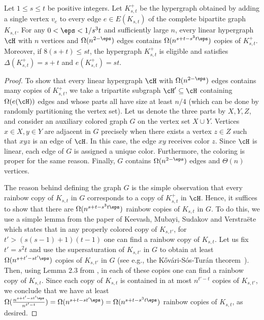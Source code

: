 \begin{lemma}\label{lemma:start}
Let $1\leq s\leq t$ be positive integers. Let $K_{s, t}^+$ be the hypergraph obtained by adding a single vertex $v_e$ to every edge $e\in E(K_{s, t})$ of the complete bipartite graph $K_{s, t}$. For any $0<\eps<1/s^3t$ and sufficiently large $n$, every linear hypergraph $\cH$ with $n$ vertices and $\Omega(n^{2-\eps})$ edges contains $\Omega(n^{s+t-s^3t\eps})$ copies of $K_{s, t}^+$. Moreover, if $8(s+t)\leq st$, the hypergraph $K_{s, t}^+$ is eligible and satisfies $\Delta(K_{s, t}^+)=s+t$ and $e(K_{s, t}^+)=st$.
\end{lemma}
\begin{proof}
To show that every linear hypergraph $\cH$ with $\Omega(n^{2-\eps})$ edges contains many copies of $K_{s, t}^+$, we take a tripartite subgraph $\cH'\subseteq \cH$ containing $\Omega(e(\cH))$ edges and whose parts all have size at least $n/4$ (which can be done by randomly partitioning the vertex set). Let us denote the three parts by $X, Y, Z$, and consider an auxiliary colored graph $G$ on the vertex set $X\cup Y$. Vertices $x\in X, y\in Y$ are adjacent in $G$ precisely when there exists a vertex $z\in Z$ such that $xyz$ is an edge of $\cH$. In this case, the edge $xy$ receives color $z$. Since $\cH$ is linear, each edge of $G$ is assigned a unique color. Furthermore, the coloring is proper for the same reason. Finally, $G$ contains $\Omega(n^{2-\eps})$ edges and $\Theta(n)$ vertices.

The reason behind defining the graph $G$ is the simple observation that every rainbow copy of $K_{s, t}$ in $G$ corresponds to a copy of $K_{s, t}^+$ in $\cH$. Hence, it suffices to show that there are $\Omega(n^{s+t-s^3t\eps})$ rainbow copies of $K_{s, t}$ in $G$. To do this, we use a simple lemma from the paper of Keevash, Mubayi, Sudakov and Verstra\"ete \cite{KMSV07} which states that in any properly colored copy of $K_{s, t'}$, for $t'>(s(s-1)+1)(t-1)$ one can find a rainbow copy of $K_{s, t}$. Let us fix $t'=s^2t$ and use the supersaturation of $K_{s, t'}$ in $G$ to obtain at least $\Omega(n^{s+t'-st'\eps})$ copies of $K_{s, t'}$ in $G$ (see e.g., the K\H{o}v\'{a}ri-S\'{o}s-Tur\'{a}n theorem~\cite{kHovari1954problem}). Then, using Lemma 2.3 from \cite{KMSV07}, in each of these copies one can find a rainbow copy of $K_{s, t}$. Since each copy of $K_{s, t}$ is contained in at most $n^{t'-t}$ copies of $K_{s, t'}$, we conclude that we have at least $\Omega(\frac{n^{s+t'-st'\eps}}{n^{t'-t}})=\Omega(n^{s+t-st'\eps})=\Omega(n^{s+t-s^3t\eps})$ rainbow copies of $K_{s, t}$, as desired.


\end{proof}

